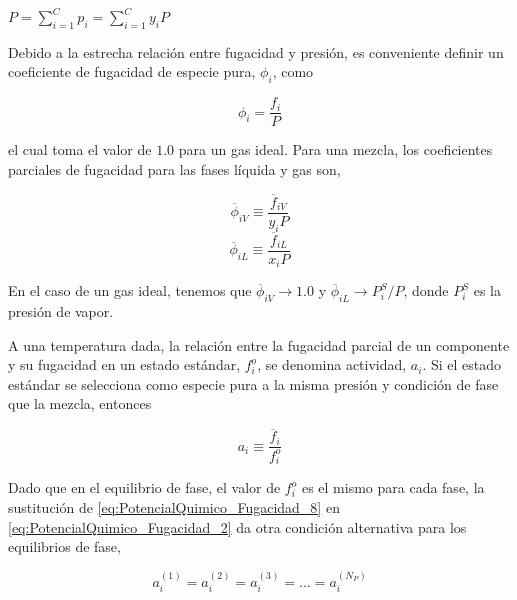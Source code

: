 \documentclass[11pt]{book}
\begin{document}
\vspace{0.3cm}
\begin{tcolorbox}[colback=blue!5!white,colframe=blue!70!black,title=Ley de Dalton]
\centering
$P = \sum_{i = 1}^{C} p_i = \sum_{i = 1}^{C} y_i P$
\end{tcolorbox}
\vspace{0.25cm}

Debido a la estrecha relación entre fugacidad y presión, es conveniente definir un coeficiente de fugacidad de especie pura, $\phi_i$, como

\begin{equation}
    \label{eq:PotencialQuimico_Fugacidad_5}
    \phi_i = \frac{f_i}{P}
\end{equation}

el cual toma el valor de $1.0$ para un gas ideal. Para una mezcla, los coeficientes parciales de fugacidad para las fases líquida y gas son,

\begin{equation}
    \label{eq:PotencialQuimico_Fugacidad_6}
    \overline{\phi}_{iV} \equiv \frac{\overline{f}_{iV}}{y_i P}
\end{equation}
\begin{equation}
    \label{eq:PotencialQuimico_Fugacidad_7}
    \overline{\phi}_{iL} \equiv \frac{\overline{f}_{iL}}{x_i P}
\end{equation}

En el caso de un gas ideal, tenemos que $\overline{\phi}_{iV} \rightarrow 1.0$ y $\overline{\phi}_{iL} \rightarrow P_i^S/P$, donde $P_i^{S}$ es la presión de vapor.

A una temperatura dada, la relación entre la fugacidad parcial de un componente y su fugacidad en un estado estándar, $f_i^o$, se denomina actividad, $a_i$. Si el estado estándar se selecciona como especie pura a la misma presión y condición de fase que la mezcla, entonces

\begin{equation}
    \label{eq:PotencialQuimico_Fugacidad_8}
    a_i \equiv \frac{\overline{f}_i}{f_i^o}
\end{equation}

Dado que en el equilibrio de fase, el valor de $f_i^o$ es el mismo para cada
fase, la sustitución de \ref{eq:PotencialQuimico_Fugacidad_8} en \ref{eq:PotencialQuimico_Fugacidad_2} da otra condición alternativa para los equilibrios de fase,

\begin{equation}
    \label{eq:PotencialQuimico_Fugacidad_9}
    a_i^{(1)} = a_i^{(2)} = a_i^{(3)} = ... = a_i^{(N_P)}
\end{equation}
\end{document}
